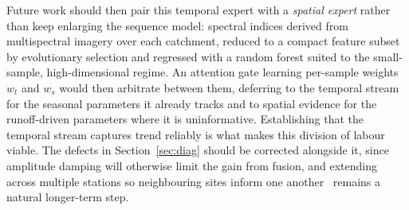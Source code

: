 \documentclass[conference]{IEEEtran}
\begin{document}
Future work should then pair this temporal expert with a \emph{spatial
expert} rather than keep enlarging the sequence model: spectral indices derived
from multispectral imagery over each catchment, reduced to a compact feature
subset by evolutionary selection and regressed with a random forest suited to
the small-sample, high-dimensional regime. An attention gate learning
per-sample weights $w_t$ and $w_s$ would then arbitrate between them, deferring
to the temporal stream for the seasonal parameters it already tracks and to
spatial evidence for the runoff-driven parameters where it is uninformative.
Establishing that the temporal stream captures trend reliably is what makes
this division of labour viable. The defects in Section~\ref{sec:diag} should be
corrected alongside it, since amplitude damping will otherwise limit the gain
from fusion, and extending across multiple stations so neighbouring sites
inform one another~\cite{yan} remains a natural longer-term step.
\end{document}
